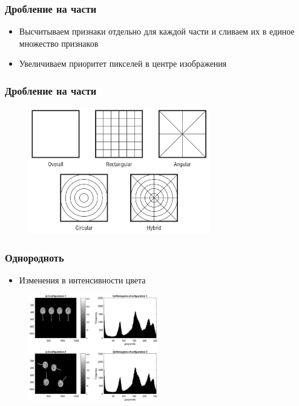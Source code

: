 \documentclass[xetex,mathserif,serif]{beamer}
\begin{document}
\begin{frame}
	\frametitle{Дробление на части}

	\begin{itemize}
		\item Высчитываем признаки отдельно для каждой части и сливаем их в единое множество признаков
		\item Увеличиваем приоритет пикселей в центре изображения
	\end{itemize}
\end{frame}


\begin{frame}
	\frametitle{Дробление на части}

	\begin{figure}[h]
		\includegraphics[width=0.7\textwidth]{./images/spartial.png}
		\centering
	\end{figure}
\end{frame}


\begin{frame}
	\frametitle{Однородноть}

	\begin{itemize}
		\item Изменения в интенсивности цвета
	\end{itemize}


	\begin{figure}[h]
		\includegraphics[width=0.5\textwidth]{./images/heter.jpg}
		\centering
	\end{figure}
\end{frame}
\end{document}
